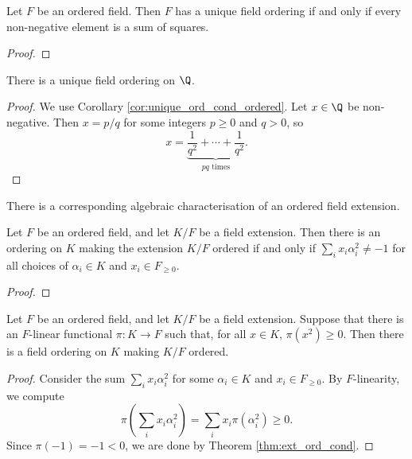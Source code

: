 \begin{corollary}
  \label{cor:unique_ord_cond_ordered}
  \leanok
  Let $F$ be an ordered field. Then $F$ has a unique field ordering if and only if every non-negative element is a sum of squares.
\end{corollary}
\begin{proof}
  \leanok
\end{proof}

\begin{corollary}
  \label{cor:unique_ord_Q}
  \leanok
  There is a unique field ordering on $\Q$.
\end{corollary}
\begin{proof}
  \leanok
  We use Corollary \ref{cor:unique_ord_cond_ordered}. Let $x\in\Q$ be non-negative. Then $x=p/q$ for some integers $p\geq0$ and $q>0$, so
  \[x=\underbrace{\frac{1}{q^2}+\cdots+\frac{1}{q^2}}_{pq\text{ times}}.\]
\end{proof}

There is a corresponding algebraic characterisation of an ordered field extension.

\begin{theorem}
  \label{thm:ext_ord_cond}
  \leanok
  Let $F$ be an ordered field, and let $K/F$ be a field extension. Then there is an ordering on $K$ making the extension $K/F$ ordered if and only if $\sum_i x_i\alpha_i^2\neq-1$ for all choices of $\alpha_i\in K$ and $x_i\in F_{\geq0}$.
\end{theorem}
\begin{proof}
  \leanok
\end{proof}

\begin{lemma}
  \label{lem:ext_ord_functional_suff}
  \leanok
  Let $F$ be an ordered field, and let $K/F$ be a field extension. Suppose that there is an $F$-linear functional $\pi:K\to F$ such that, for all $x\in K$, $\pi(x^2)\geq0$. Then there is a field ordering on $K$ making $K/F$ ordered.
\end{lemma}
\begin{proof}
  \leanok
  Consider the sum $\sum_i x_i\alpha_i^2$ for some $\alpha_i\in K$ and $x_i\in F_{\geq0}$. By $F$-linearity, we compute
  \[\pi\left(\sum_i x_i\alpha_i^2\right)=\sum_i x_i\pi(\alpha_i^2)\geq0.\]
  Since $\pi(-1)=-1<0$, we are done by Theorem \ref{thm:ext_ord_cond}.
\end{proof}

